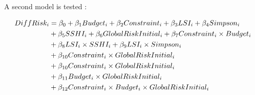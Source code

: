 A second model is tested :

\begin{align}
\label{model:interacted}
DiffRisk_{i} &= \beta_0 + \beta_1 Budget_i + \beta_2 Constraint_i + \beta_3 LSI_i + \beta_4 Simpson_i \\
& + \beta_5 SSHI_i + \beta_6 GlobalRiskInitial_i + \beta_7 Constraint_i \times Budget_i \notag\\
& + \beta_8 LSI_i \times SSHI_i + \beta_9 LSI_i \times Simpson_i \notag\\
&  + \beta_{10}Constraint_i\times GlobalRiskInitial_i \notag \\
& + \beta_{10}Constraint_i\times GlobalRiskInitial_i \notag\\
& +\beta_{11}Budget_i\times GlobalRiskInitial_i \notag\\
& + \beta_{12} Constraint_i\times Budget_i \times GlobalRiskInitial_i \notag
\end{align}


